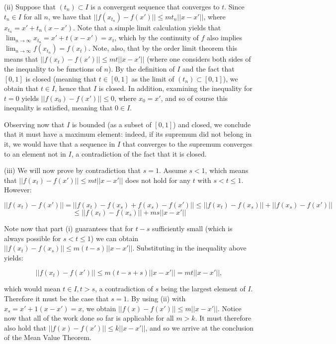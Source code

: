 \begin{solution}
    (ii) Suppose that $(t_n) \subset I$ is a convergent sequence that converges to $t$.
    Since $t_n \in I$ for all $n$, we have that $\lvert \lvert f(x_{t_n}) - f(x') \rvert \rvert \leq m t_n \lvert \lvert x - x' \rvert \rvert$, where $x_{t_n} = x' + t_n(x - x')$.
    Note that a simple limit calculation yields that $\lim_{n \rightarrow \infty} x_{t_n} = x' + t(x - x') = x_t$, which by the continuity of $f$ also implies $\lim_{n \rightarrow \infty} f(x_{t_n}) = f(x_t)$.
    Note, also, that by the order limit theorem this means that $\lvert \lvert f(x_t) - f(x') \rvert \rvert \leq m t \lvert \lvert x - x' \rvert \rvert$ (where one considers both sides of the inequality to be functions of $n$).
    By the definition of $I$ and the fact that $[0, 1]$ is closed (meaning that $t \in [0,1]$ as the limit of $(t_n) \subset [0, 1]$), we obtain that $t \in I$, hence that $I$ is closed.
    In addition, examining the inequality for $t = 0$ yields $\lvert \lvert f(x_0) - f(x') \rvert \rvert \leq 0$, where $x_0 = x'$, and so of course this inequality is satisfied, meaning that $0 \in I$.

    Observing now that $I$ is bounded (as a subset of $[0, 1]$) and closed, we conclude that it must have a maximum element: indeed, if its supremum did not belong in it, we would have that a sequence in $I$ that converges to the supremum converges to an element not in $I$, a contradiction of the fact that it is closed.

    (iii) We will now prove by contradiction that $s = 1$.
    Assume $s < 1$, which means that $\lvert \lvert f(x_t) - f(x') \rvert \rvert \leq mt\lvert \lvert x - x' \rvert \rvert$ does not hold for any $t$ with $s < t \leq 1$.
    However:

    $$\lvert \lvert f(x_t) - f(x') \rvert \rvert = \lvert \lvert f(x_t) - f(x_s) + f(x_s) - f(x') \rvert \rvert \leq \lvert \lvert f(x_t) - f(x_s) \rvert \rvert + \lvert \lvert f(x_s) - f(x') \rvert \rvert$$
    $$\leq \lvert \lvert f(x_t) - f(x_s) \rvert \rvert + m s \lvert \lvert x - x' \rvert \rvert$$

    Note now that part (i) guarantees that for $t -s $ sufficiently small (which is always possible for $s < t \leq 1$) we can obtain $\lvert \lvert f(x_t) - f(x_s) \rvert \rvert \leq m(t - s) \lvert \lvert x - x' \rvert \rvert$.
    Substituting in the inequality above yields:

    $$\lvert \lvert f(x_t) - f(x') \rvert \rvert \leq m (t - s + s)\lvert \lvert x - x' \rvert \rvert = mt \lvert \lvert x - x' \rvert \rvert,$$

    which would mean $t \in I, t > s$, a contradiction of $s$ being the largest element of $I$.
    Therefore it must be the case that $s = 1$.
    By using (ii) with $x_s = x' + 1(x - x') = x$, we obtain $\lvert \lvert f(x) - f(x') \rvert \rvert \leq m \lvert \lvert x - x' \rvert \rvert$.
    Notice now that all of the work done so far is applicable for all $m > k$.
    It must therefore also hold that $\lvert \lvert f(x) - f(x') \rvert \rvert \leq k \lvert \lvert x - x' \rvert \rvert$, and so we arrive at the conclusion of the Mean Value Theorem.
\end{solution}

